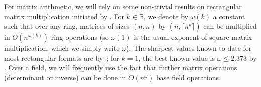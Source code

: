 For matrix arithmetic, we will rely on some non-trivial results on
rectangular matrix multiplication initiated by \cite{LoRo83}. For $k \in
\mathbb{R}$, we denote by $\omega(k)$ a constant such that over any
ring, matrices of sizes $(n,n)$ by $(n,\lceil n^k \rceil)$ can be
multiplied in $O(n^{\omega(k)})$ ring operations (so $\omega(1)$ is
the usual exponent of square matrix multiplication, which we simply
write $\omega$).  The sharpest values known to date for most
rectangular formats are by~\cite{LeGall}; for $k=1$, the best known
value is $\omega \le 2.373$ by . Over a field, we will
frequently use the fact that further matrix operations (determinant or
inverse) can be done in $O(n^\omega)$ base field operations.


